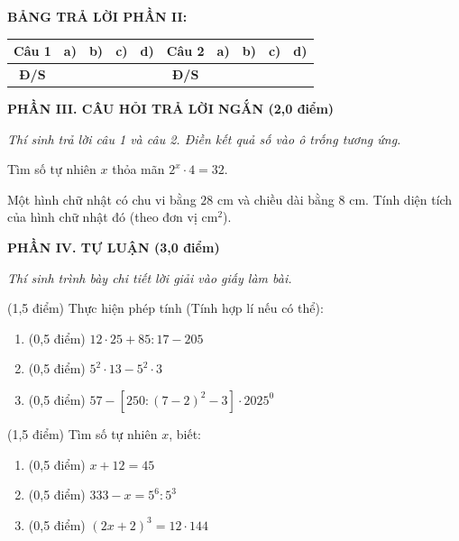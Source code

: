 \documentclass[12pt,a4paper]{article}
\begin{document}
\noindent\textbf{BẢNG TRẢ LỜI PHẦN II:}
\begin{center}
\begin{tabular}{|c|c|c|c|c||c|c|c|c|c|}
\hline
\textbf{Câu 1} & \textbf{a)} & \textbf{b)} & \textbf{c)} & \textbf{d)} & \textbf{Câu 2} & \textbf{a)} & \textbf{b)} & \textbf{c)} & \textbf{d)} \\
\hline
\textbf{Đ/S} & \rule{0pt}{0.6cm} & & & & \textbf{Đ/S} & & & & \\
\hline
\end{tabular}
\end{center}
\vspace{2mm}

\setcounter{ex}{0}
\noindent\textbf{\large PHẦN III. CÂU HỎI TRẢ LỜI NGẮN (2,0 điểm)}

\textit{Thí sinh trả lời câu 1 và câu 2. Điền kết quả số vào ô trống tương ứng.}

\vspace{1mm}
\begin{ex}
Tìm số tự nhiên $x$ thỏa mãn $2^x \cdot 4 = 32$. 
\end{ex}

\begin{ex}
Một hình chữ nhật có chu vi bằng $28\text{ cm}$ và chiều dài bằng $8\text{ cm}$. Tính diện tích của hình chữ nhật đó (theo đơn vị $\text{cm}^2$). 
\end{ex}


\setcounter{ex}{0}
\noindent\textbf{\large PHẦN IV. TỰ LUẬN (3,0 điểm)}

\textit{Thí sinh trình bày chi tiết lời giải vào giấy làm bài.}

\vspace{1mm}
\begin{ex} (1,5 điểm)
Thực hiện phép tính (Tính hợp lí nếu có thể):
\begin{enumerate}[label=\textbf{\alph*)}, leftmargin=0.8cm, itemsep=2pt]
\item (0,5 điểm) $12 \cdot 25 + 85 : 17 - 205$
\item (0,5 điểm) $5^2 \cdot 13 - 5^2 \cdot 3$
\item (0,5 điểm) $57 - [250 : (7 - 2)^2 - 3] \cdot 2025^0$
\end{enumerate}
\end{ex}
\vspace{1.5mm}

\begin{ex} (1,5 điểm)
Tìm số tự nhiên $x$, biết:
\begin{enumerate}[label=\textbf{\alph*)}, leftmargin=0.8cm, itemsep=2pt]
\item (0,5 điểm) $x + 12 = 45$
\item (0,5 điểm) $333 - x = 5^6 : 5^3$
\item (0,5 điểm) $(2x + 2)^3 = 12 \cdot 144$
\end{enumerate}
\end{ex}
\vspace{1.5mm}
\end{document}
